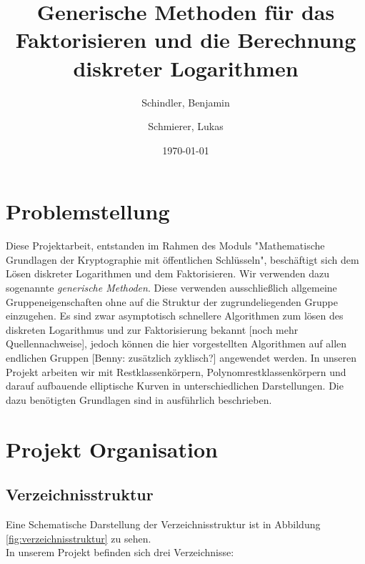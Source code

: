 \documentclass{scrartcl}
\begin{document}
\titlehead{
  Universität Leipzig \\
  Fakultät für Mathematik und Informatik \\
  Institut für Informatik
}
\subject{Projekt Dokumentation}
\title{Generische Methoden für das Faktorisieren und die Berechnung diskreter Logarithmen}
\author{Schindler, Benjamin \and Schmierer, Lukas}
\date{\today}
\publishers{Dr. Claus Diem}
\maketitle

\tableofcontents

\section{Problemstellung}
Diese Projektarbeit, entstanden im Rahmen des Moduls "Mathematische Grundlagen der Kryptographie mit öffentlichen Schlüsseln", beschäftigt sich dem Lösen diskreter Logarithmen und dem Faktorisieren. Wir verwenden dazu sogenannte \emph{generische Methoden}. Diese verwenden ausschließlich allgemeine Gruppeneigenschaften ohne auf die Struktur der zugrundeliegenden Gruppe einzugehen. Es sind zwar asymptotisch schnellere Algorithmen zum lösen des diskreten Logarithmus und zur Faktorisierung bekannt \cite{diem_2011, Adleman_1979}[noch mehr Quellennachweise], jedoch können die hier vorgestellten Algorithmen auf allen endlichen Gruppen [Benny: zusätzlich zyklisch?] angewendet werden. In unseren Projekt arbeiten wir mit Restklassenkörpern, Polynomrestklassenkörpern und darauf aufbauende elliptische Kurven in unterschiedlichen Darstellungen. Die dazu benötigten Grundlagen sind in \cite{Galbraith2012} ausführlich beschrieben. 
\section{Projekt Organisation}
\label{sec:organisation}

\subsection{Verzeichnisstruktur}
\label{sec:verzeichnisstruktur}
Eine Schematische Darstellung der Verzeichnisstruktur ist in Abbildung \ref{fig:verzeichnisstruktur} zu sehen.\\
In unserem Projekt befinden sich drei Verzeichnisse:
\end{document}
